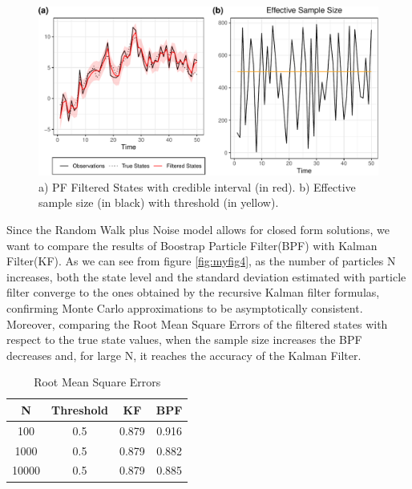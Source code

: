 \documentclass[
]{book}
\theoremstyle{break}
\theoremstyle{nonumberplain}
\begin{document}
\begin{figure}[H]

{\centering \includegraphics{prova_knit_finale_files/figure-latex/myfig3-1} 

}

\caption{a) PF Filtered States with credible interval (in red). b) Effective sample size (in black) with threshold (in yellow).}\label{fig:myfig3}
\end{figure}

Since the Random Walk plus Noise model allows for closed form solutions,
we want to compare the results of Boostrap Particle Filter(BPF) with
Kalman Filter(KF). As we can see from figure \ref{fig:myfig4}, as the
number of particles N increases, both the state level and the standard
deviation estimated with particle filter converge to the ones obtained
by the recursive Kalman filter formulas, confirming Monte Carlo
approximations to be asymptotically consistent. Moreover, comparing the
Root Mean Square Errors of the filtered states with respect to the true
state values, when the sample size increases the BPF decreases and, for
large N, it reaches the accuracy of the Kalman Filter.

\begin{longtable}[t]{cccc}
\caption{\label{tab:unnamed-chunk-12}Root Mean Square Errors}\\
\toprule
N & Threshold & KF & BPF\\
\midrule
100 & 0.5 & 0.879 & 0.916\\
1000 & 0.5 & 0.879 & 0.882\\
10000 & 0.5 & 0.879 & 0.885\\
\bottomrule
\end{longtable}
\end{document}
